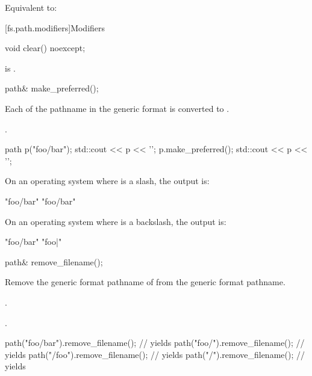 \begin{itemdescr}
\pnum
\effects
Equivalent to: 
\end{itemdescr}

[fs.path.modifiers]{Modifiers}

%
\begin{itemdecl}
void clear() noexcept;
\end{itemdecl}

\begin{itemdescr}
\pnum
\ensures
{} is .
\end{itemdescr}

%
\begin{itemdecl}
path& make_preferred();
\end{itemdecl}

\begin{itemdescr}
\pnum
\effects
Each 
of the pathname in the generic format
is converted to .

\pnum
\returns
{}.

\pnum
\begin{example}
\begin{codeblock}
path p("foo/bar");
std::cout << p << '\n';
p.make_preferred();
std::cout << p << '\n';
\end{codeblock}
On an operating system where  is a slash,
the output is:
\begin{codeblock}
"foo/bar"
"foo/bar"
\end{codeblock}
On an operating system where  is a backslash, the
output is:
\begin{codeblock}
"foo/bar"
"foo\bar"
\end{codeblock}
\end{example}
\end{itemdescr}

%
\begin{itemdecl}
path& remove_filename();
\end{itemdecl}

\begin{itemdescr}
\pnum
\effects
Remove the generic format pathname of  from the generic format pathname.

\pnum
\ensures
{}.

\pnum
\returns
{}.

\pnum
\begin{example}
\begin{codeblock}
path("foo/bar").remove_filename();      // yields 
path("foo/").remove_filename();         // yields 
path("/foo").remove_filename();         // yields 
path("/").remove_filename();            // yields 
\end{codeblock}
\end{example}
\end{itemdescr}

